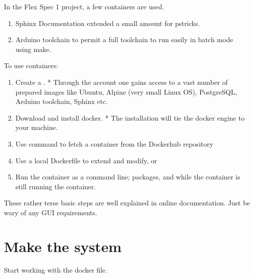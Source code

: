\documentclass[letterpaper,10pt,english,openany,oneside]{sphinxmanual}
\begin{document}
\sphinxAtStartPar
In the Flex Spec 1 project, a few containers are used.
\begin{enumerate}
%
\item {} 
\sphinxAtStartPar
Sphinx Documentation \textendash{} extended a small amount for pstricks.

\item {} 
\sphinxAtStartPar
Arduino toolchain to permit a full toolchain to run easily in batch mode using make.

\end{enumerate}

\sphinxAtStartPar
To use containers:
\begin{enumerate}
%
\item {} 
\sphinxAtStartPar
Create a .
* Through the account one gains access to a vast number of prepared images like Ubuntu, Alpine (very small Linux OS), PostgreSQL, Arduino toolchain, Sphinx etc.

\item {} 
\sphinxAtStartPar
Download and install docker.
* The installation will tie the docker engine to your machine.

\item {} 
\sphinxAtStartPar
Use  command to fetch a container from the Dockerhub repository

\item {} 
\sphinxAtStartPar
Use a local Dockerfile to extend and modify, or

\item {} 
\sphinxAtStartPar
Run the container as a  command line;  packages, and while the container is still running  the container.

\end{enumerate}

\sphinxAtStartPar
These rather terse basic steps are well explained in online documentation. Just be wary of any GUI requirements.


\section{Make the system}
\label{\detokenize{docker:make-the-system}}
\sphinxAtStartPar
Start working with the docker file.
\end{document}
